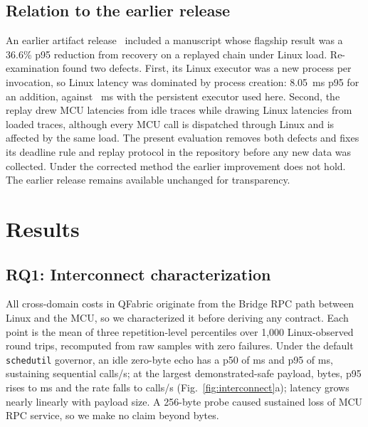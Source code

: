 \documentclass[conference]{IEEEtran}
\newcommand{\system}{QFabric\xspace}
\begin{document}
\subsection{Relation to the earlier release}
\label{sec:correction}
An earlier artifact release~\cite{qfabric2026v101} included a manuscript
whose flagship result was a 36.6\% p95 reduction from recovery on a
replayed chain under Linux load. Re-examination found two defects. First,
its Linux executor was a new process per invocation, so Linux latency was
dominated by process creation: 8.05~ms p95 for an addition, against
\StageTwelveIdleLinuxAddP~ms with the persistent executor used here. Second,
the replay drew MCU latencies from idle traces while drawing Linux latencies
from loaded traces, although every MCU call is dispatched through Linux and
is affected by the same load. The present evaluation removes both defects
and fixes its deadline rule and replay protocol in the repository before any
new data was collected. Under the corrected method the earlier improvement
does not hold. The earlier release remains available unchanged for
transparency.

\section{Results}
\label{sec:results}
\subsection{RQ1: Interconnect characterization}
\label{sec:interconnect}
All cross-domain costs in \system originate from the Bridge RPC path between
Linux and the MCU, so we characterized it before deriving any contract.
Each point is the mean of three repetition-level percentiles over 1,000
Linux-observed round trips, recomputed from \IcRawSamplesVerified{} raw samples
with zero failures. Under the default \texttt{schedutil} governor, an idle
zero-byte echo has a p50 of \IcZeroByteIdlePfifty{} ms and p95 of
\IcZeroByteIdlePninetyfive{} ms, sustaining \IcZeroByteIdleCallsPerSec{}
sequential calls/s; at the largest demonstrated-safe payload,
\IcMaxPayloadBytes{} bytes, p95 rises to \IcMaxPayloadIdlePninetyfive{} ms and
the rate falls to \IcMaxPayloadIdleCallsPerSec{} calls/s
(Fig.~\ref{fig:interconnect}a); latency grows nearly linearly with payload
size. A 256-byte probe caused sustained loss of MCU RPC service, so we
make no claim beyond \IcMaxPayloadBytes{} bytes.
\end{document}
